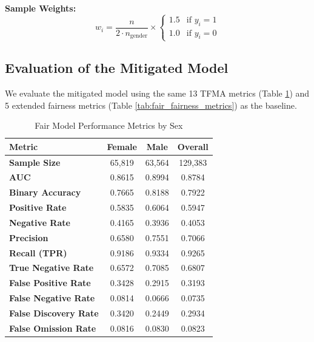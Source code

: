 \documentclass[11pt,a4paper]{article}
\begin{document}
\textbf{Sample Weights:}
\begin{equation}
w_i = \frac{n}{2 \cdot n_{\text{gender}}} \times \begin{cases}
1.5 & \text{if } y_i = 1 \\
1.0 & \text{if } y_i = 0
\end{cases}
\end{equation}

\subsection{Evaluation of the Mitigated Model}

We evaluate the mitigated model using the same 13 TFMA metrics (Table \ref{tab:fair_performance_by_sex}) and 5 extended fairness metrics (Table \ref{tab:fair_fairness_metrics}) as the baseline.

\begin{table}[h]
\centering
\caption{Fair Model Performance Metrics by Sex}
\label{tab:fair_performance_by_sex}
\begin{tabular}{|l|c|c|c|}
\hline
\textbf{Metric} & \textbf{Female} & \textbf{Male} & \textbf{Overall} \\
\hline
\textbf{Sample Size} & 65,819 & 63,564 & 129,383 \\
\hline
\textbf{AUC} & 0.8615 & 0.8994 & 0.8784 \\
\textbf{Binary Accuracy} & 0.7665 & 0.8188 & 0.7922 \\
\hline
\textbf{Positive Rate} & 0.5835 & 0.6064 & 0.5947 \\
\textbf{Negative Rate} & 0.4165 & 0.3936 & 0.4053 \\
\hline
\textbf{Precision} & 0.6580 & 0.7551 & 0.7066 \\
\textbf{Recall (TPR)} & 0.9186 & 0.9334 & 0.9265 \\
\textbf{True Negative Rate} & 0.6572 & 0.7085 & 0.6807 \\
\hline
\textbf{False Positive Rate} & 0.3428 & 0.2915 & 0.3193 \\
\textbf{False Negative Rate} & 0.0814 & 0.0666 & 0.0735 \\
\textbf{False Discovery Rate} & 0.3420 & 0.2449 & 0.2934 \\
\textbf{False Omission Rate} & 0.0816 & 0.0830 & 0.0823 \\
\hline
\end{tabular}
\end{table}
\end{document}
